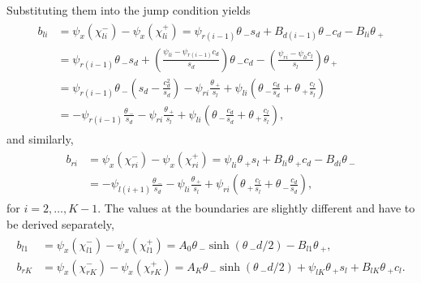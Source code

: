 \documentclass[a4paper,10pt]{article}
\newcommand{\tH}{\ensuremath{\theta\,}}
\begin{document}
Substituting them into the jump condition yields
% 
\begin{equation}
\label{eqn:psi_eval_bl}
\begin{split}
\begin{aligned}
  b_{li} &= \psi_x(\chi_{li}^-) - \psi_x(\chi_{li}^+) = \psi_{r(i-1)}\tH_-s_d + B_{d(i-1)}\tH_-c_d -B_{li}\tH_+\\
		 &= \psi_{r(i-1)}\tH_-s_d + \left(\frac{\psi_{li} - \psi_{r(i-1)}c_d}{s_d}\right)\tH_-c_d -\left(\frac{\psi_{ri} - \psi_{li}c_l}{s_l}\right)\tH_+\\
		 &= \psi_{r(i-1)}\tH_-\left(s_d - \frac{c_d^2}{s_d} \right) - \psi_{ri}\frac{\tH_+}{s_l} + \psi_{li}\left(\tH_-\frac{c_d}{s_d} + \tH_+\frac{c_l}{s_l} \right)\\
		 &= - \psi_{r(i-1)}\frac{\tH_-}{s_d} - \psi_{ri}\frac{\tH_+}{s_l} + \psi_{li}\left(\tH_-\frac{c_d}{s_d} + \tH_+\frac{c_l}{s_l} \right),
\end{aligned}
\end{split}
\end{equation}
% 
and similarly,
% 
\begin{equation}
\label{eqn:psi_eval_br}
\begin{split}
\begin{aligned}
  b_{ri} &= \psi_x(\chi_{ri}^-) - \psi_x(\chi_{ri}^+) = \psi_{li}\tH_+s_l + B_{li}\tH_+c_d -B_{di}\tH_-\\
		 &= - \psi_{l(i+1)}\frac{\tH_-}{s_d} - \psi_{li}\frac{\tH_+}{s_l} + \psi_{ri}\left(\tH_+\frac{c_l}{s_l} + \tH_-\frac{c_d}{s_d} \right),
\end{aligned}
\end{split}
\end{equation}
% 
for $i=2,\ldots,K-1$. The values at the boundaries are slightly different and have to be derived separately,
% 
\begin{equation*}
\begin{split}
\begin{aligned}
  b_{l1} &= \psi_x(\chi_{l1}^-) - \psi_x(\chi_{l1}^+) = A_0\tH_-\sinh(\tH_-d/2) - B_{l1}\tH_+,\\
  b_{rK} &= \psi_x(\chi_{rK}^-) - \psi_x(\chi_{rK}^+) = A_K\tH_-\sinh(\tH_-d/2) + \psi_{lK}\tH_+s_l + B_{lK}\tH_+c_l.
\end{aligned}
\end{split}
\end{equation*}
\end{document}
